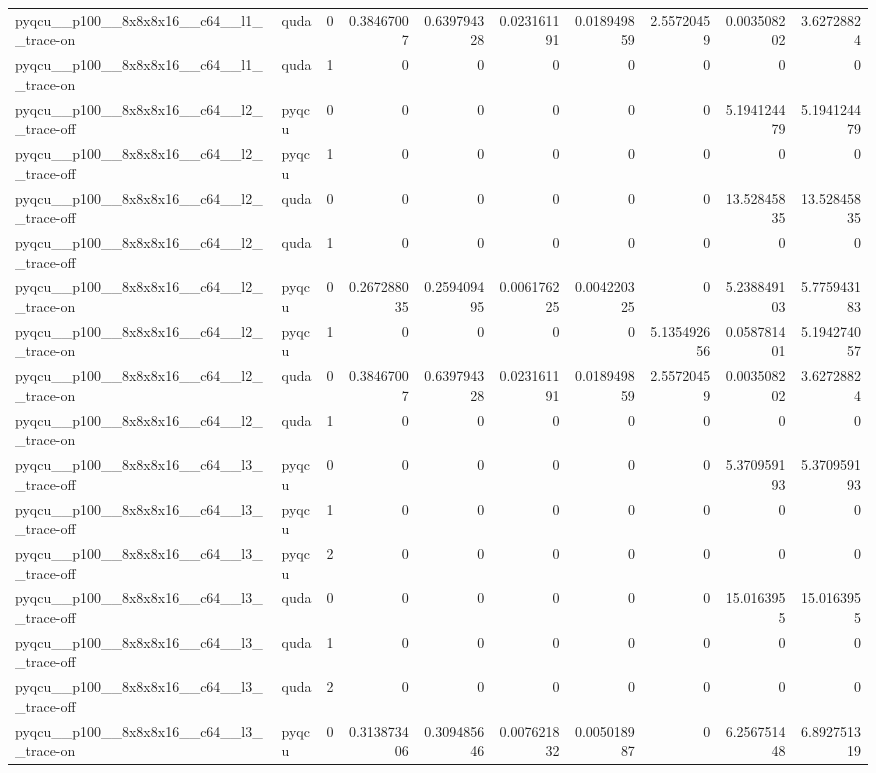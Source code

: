 \begin{table}[htbp]
\begin{tabular}{@{}llrrrrrrrr@{}}
pyqcu\_\_p100\_\_8x8x8x16\_\_c64\_\_l1\_\_trace-on & quda & 0 & 0.38467007 & 0.639794328 & 0.023161191 & 0.018949859 & 2.55720459 & 0.003508202 & 3.62728824 \\
pyqcu\_\_p100\_\_8x8x8x16\_\_c64\_\_l1\_\_trace-on & quda & 1 & 0 & 0 & 0 & 0 & 0 & 0 & 0 \\
pyqcu\_\_p100\_\_8x8x8x16\_\_c64\_\_l2\_\_trace-off & pyqcu & 0 & 0 & 0 & 0 & 0 & 0 & 5.194124479 & 5.194124479 \\
pyqcu\_\_p100\_\_8x8x8x16\_\_c64\_\_l2\_\_trace-off & pyqcu & 1 & 0 & 0 & 0 & 0 & 0 & 0 & 0 \\
pyqcu\_\_p100\_\_8x8x8x16\_\_c64\_\_l2\_\_trace-off & quda & 0 & 0 & 0 & 0 & 0 & 0 & 13.52845835 & 13.52845835 \\
pyqcu\_\_p100\_\_8x8x8x16\_\_c64\_\_l2\_\_trace-off & quda & 1 & 0 & 0 & 0 & 0 & 0 & 0 & 0 \\
pyqcu\_\_p100\_\_8x8x8x16\_\_c64\_\_l2\_\_trace-on & pyqcu & 0 & 0.267288035 & 0.259409495 & 0.006176225 & 0.004220325 & 0 & 5.238849103 & 5.775943183 \\
pyqcu\_\_p100\_\_8x8x8x16\_\_c64\_\_l2\_\_trace-on & pyqcu & 1 & 0 & 0 & 0 & 0 & 5.135492656 & 0.058781401 & 5.194274057 \\
pyqcu\_\_p100\_\_8x8x8x16\_\_c64\_\_l2\_\_trace-on & quda & 0 & 0.38467007 & 0.639794328 & 0.023161191 & 0.018949859 & 2.55720459 & 0.003508202 & 3.62728824 \\
pyqcu\_\_p100\_\_8x8x8x16\_\_c64\_\_l2\_\_trace-on & quda & 1 & 0 & 0 & 0 & 0 & 0 & 0 & 0 \\
pyqcu\_\_p100\_\_8x8x8x16\_\_c64\_\_l3\_\_trace-off & pyqcu & 0 & 0 & 0 & 0 & 0 & 0 & 5.370959193 & 5.370959193 \\
pyqcu\_\_p100\_\_8x8x8x16\_\_c64\_\_l3\_\_trace-off & pyqcu & 1 & 0 & 0 & 0 & 0 & 0 & 0 & 0 \\
pyqcu\_\_p100\_\_8x8x8x16\_\_c64\_\_l3\_\_trace-off & pyqcu & 2 & 0 & 0 & 0 & 0 & 0 & 0 & 0 \\
pyqcu\_\_p100\_\_8x8x8x16\_\_c64\_\_l3\_\_trace-off & quda & 0 & 0 & 0 & 0 & 0 & 0 & 15.0163955 & 15.0163955 \\
pyqcu\_\_p100\_\_8x8x8x16\_\_c64\_\_l3\_\_trace-off & quda & 1 & 0 & 0 & 0 & 0 & 0 & 0 & 0 \\
pyqcu\_\_p100\_\_8x8x8x16\_\_c64\_\_l3\_\_trace-off & quda & 2 & 0 & 0 & 0 & 0 & 0 & 0 & 0 \\
pyqcu\_\_p100\_\_8x8x8x16\_\_c64\_\_l3\_\_trace-on & pyqcu & 0 & 0.313873406 & 0.309485646 & 0.007621832 & 0.005018987 & 0 & 6.256751448 & 6.892751319 \\

\end{tabular}
\end{table}
